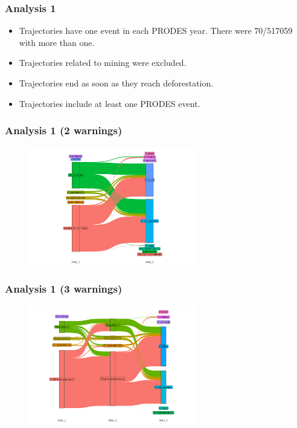 \documentclass[aspectratio=169]{beamer}
\begin{document}
\begin{frame}
    \frametitle{Analysis 1}
    \begin{itemize}
        \item Trajectories have one event in each PRODES year. There were 
            70/517059 with more than one.
        \item Trajectories related to mining were excluded.
        \item Trajectories end as soon as they reach deforestation.
        \item Trajectories include at least one PRODES event.
    \end{itemize}
\end{frame}

\begin{frame}
    \frametitle{Analysis 1 (2 warnings) }
    \begin{figure}[h] 
    \includegraphics[width=0.65\textwidth]{./figures/an1_plot_deter_prodes_subarea_trajectory_2.png}
    \end{figure}
\end{frame}

\begin{frame}
    \frametitle{Analysis 1 (3 warnings) }
    \begin{figure}[h] 
    \includegraphics[width=0.65\textwidth]{./figures/an1_plot_deter_prodes_subarea_trajectory_3.png}
    \end{figure}
\end{frame}
\end{document}
